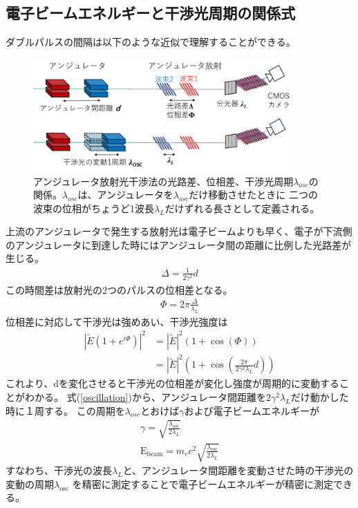 \documentclass[a4paper,11pt,uplatex]{jsbook}
\begin{document}
\subsection{電子ビームエネルギーと干渉光周期の関係式}
ダブルパルスの間隔は以下のような近似で理解することができる。
\begin{figure}[h]
  \centering
  \includegraphics[width=10cm]{image/2-lambdaosc.png}
  \caption{アンジュレータ放射光干渉法の光路差、位相差、干渉光周期$\lambda_{osc}$の関係。$\lambda_{osc}$は、アンジュレータを$\lambda_{osc}$だけ移動させたときに
  二つの波束の位相がちょうど1波長$\lambda_L$だけずれる長さとして定義される。}
\end{figure}
上流のアンジュレータで発生する放射光は電子ビームよりも早く、電子が下流側のアンジュレータに到達した時にはアンジュレータ間の距離に比例した光路差が生じる。
\begin{eqnarray}
  \Delta = \frac{1}{2\gamma^2}d \label{path shift}
\end{eqnarray}
この時間差は放射光の2つのパルスの位相差となる。
\begin{eqnarray}
  \Phi = 2\pi \frac{\Delta}{\lambda_L}
\end{eqnarray}
位相差に対応して干渉光は強めあい、干渉光強度は
\begin{eqnarray}
  |\tilde{E} \left( 1+ e^{i\Phi}\right)|^2 
&= |\tilde{E}|^2 \left( 1 + \cos(\Phi) \right)\\
&= |\tilde{E}|^2 \left( 1 + \cos(\frac{2\pi}{2\gamma^2\lambda_L}d) \right) 
  \label{oscillation}
\end{eqnarray}
これより、dを変化させると干渉光の位相差が変化し強度が周期的に変動することがわかる。
式(\ref{oscillation})から、アンジュレータ間距離を$2\gamma^2\lambda_L$だけ動かした時に１周する。
この周期を$\lambda_{osc}$とおけば$\gamma$および電子ビームエネルギーが
\begin{eqnarray}
  \gamma = \sqrt{\frac{\lambda_{\text{osc}}}{2\lambda_L}}\\
  \text{E}_\text{beam} =m_e c^2  \sqrt{\frac{\lambda_{\text{osc}}}{2\lambda_L}} \label{zero order energy formula}
\end{eqnarray}
すなわち、干渉光の波長$\lambda_L$と、アンジュレータ間距離を変動させた時の干渉光の変動の周期$\lambda_{\text{osc}}$
を精密に測定することで電子ビームエネルギーが精密に測定できる。
\end{document}
